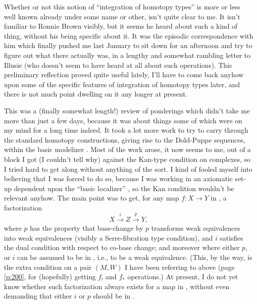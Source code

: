 Whether or not this notion of ``integration of homotopy types'' is
more or less well known already under some name or other, isn't quite
clear to me. It isn't familiar to Ronnie Brown visibly, but it seems
he heard about such a kind of thing, without his being specific about
it. It was the episodic correspondence with him which
finally pushed me last January to sit down for an afternoon and try to
figure out what there actually was, in a lengthy and somewhat rambling
letter to Illusie (who doesn't seem to have heard at all about such
operations). This preliminary reflection proved quite useful lately,
I'll have to come back anyhow upon some of the specific features of
integration of homotopy types later, and there is not much point
dwelling on it any longer at present.

\label{sec:70}%
This was a (finally somewhat length!) review of ponderings which
didn't take me more than just a few days, because it was about things
some of which were on my mind for a long time indeed. It took a lot
more work to try to carry through the standard homotopy constructions,
giving rise to the Dold-Puppe sequences, within the basic modelizer
\Cat. Most of the work arose, it now seems to me, out of a block I got
(I couldn't tell why) against the Kan-type condition on complexes, so
I tried hard to get along without anything of the sort. I kind of
fooled myself into believing that I was forced to do so, because I was
working in an axiomatic set-up dependent upon the ``basic localizer''
\scrW, so the Kan condition wouldn't be relevant anyhow. The main
point was to get, for any map $f:X\to Y$ in \Cat, a factorization
\[ X \xrightarrow i Z \xrightarrow p Y,\]
where $p$ has the property that base-change by $p$ transforms weak
equivalences into weak equivalences (visibly a Serre-fibration type
condition), and $i$ satisfies the dual condition with respect to
co-base change; and moreover where either $p$, or $i$ can be assumed
to be in \scrW, i.e., to be a weak equivalence. (This, by the way, is
the extra condition on a pair $(M,W)$ I have been referring to above
(page \ref{p:200}, for (hopefully) getting $f_!$ and $f_*$
operations.) At present, I do not yet know whether such factorization
always exists for a map in \Cat, without even demanding that either
$i$ or $p$ should be in \scrW.

